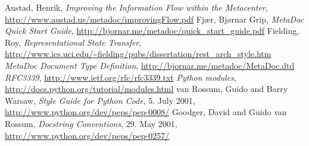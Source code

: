 \newpage
\begin{thebibliography}{99}
     Austad, Henrik, \textit{Improving the Information
    Flow within the Metacenter},
    \url{http://www.austad.us/metadoc/improvingFlow.pdf}
     Fjær, Bjørnar Grip, \textit{MetaDoc Quick Start
    Guide}, \url{http://bjornar.me/metadoc/quick_start_guide.pdf}
     Fielding, Roy, \textit{Representational State Transfer},
    \url{http://www.ics.uci.edu/~fielding/pubs/dissertation/rest_arch_style.htm}
     \textit{MetaDoc Document Type Definition}, 
        \url{http://bjornar.me/metadoc/MetaDoc.dtd}
     \textit{RFC3339}, \url{http://www.ietf.org/rfc/rfc3339.txt}
     \textit{Python modules},
    \url{http://docs.python.org/tutorial/modules.html}
     van Rossum, Guido and Barry Warsaw, \textit{Style Guide for
    Python Code}, 5. July 2001, \url{http://www.python.org/dev/peps/pep-0008/}
     Goodger, David and Guido van Rossum, \textit{Docstring
    Conventions}, 29. May 2001, \url{http://www.python.org/dev/peps/pep-0257/}
\end{thebibliography}

